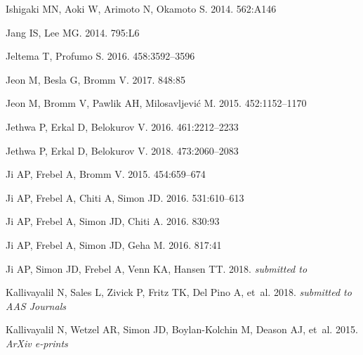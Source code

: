 \documentclass[a4paper]{ar-1col}
\begin{document}
\begin{thebibliography}{}
{Ishigaki} MN, {Aoki} W, {Arimoto} N, {Okamoto} S. 2014.
\textit{\aap} 562:A146

{Jang} IS, {Lee} MG. 2014.
\textit{\apjl} 795:L6

{Jeltema} T, {Profumo} S. 2016.
\textit{\mnras} 458:3592--3596

{Jeon} M, {Besla} G, {Bromm} V. 2017.
\textit{\apj} 848:85

{Jeon} M, {Bromm} V, {Pawlik} AH, {Milosavljevi{\'c}} M. 2015.
\textit{\mnras} 452:1152--1170

{Jethwa} P, {Erkal} D, {Belokurov} V. 2016.
\textit{\mnras} 461:2212--2233

{Jethwa} P, {Erkal} D, {Belokurov} V. 2018.
\textit{\mnras} 473:2060--2083

{Ji} AP, {Frebel} A, {Bromm} V. 2015.
\textit{\mnras} 454:659--674

{Ji} AP, {Frebel} A, {Chiti} A, {Simon} JD. 2016{}.
\textit{\nat} 531:610--613

{Ji} AP, {Frebel} A, {Simon} JD, {Chiti} A. 2016{}.
\textit{\apj} 830:93

{Ji} AP, {Frebel} A, {Simon} JD, {Geha} M. 2016{}.
\textit{\apj} 817:41

{Ji} AP, {Simon} JD, {Frebel} A, {Venn} KA, {Hansen} TT. 2018.
\textit{submitted to \apj}

{Kallivayalil} N, {Sales} L, {Zivick} P, {Fritz} TK, {Del Pino} A, et~al. 2018.
\textit{submitted to AAS Journals}

{Kallivayalil} N, {Wetzel} AR, {Simon} JD, {Boylan-Kolchin} M, {Deason} AJ,
  et~al. 2015.
\textit{ArXiv e-prints}


\end{thebibliography}
\end{document}
